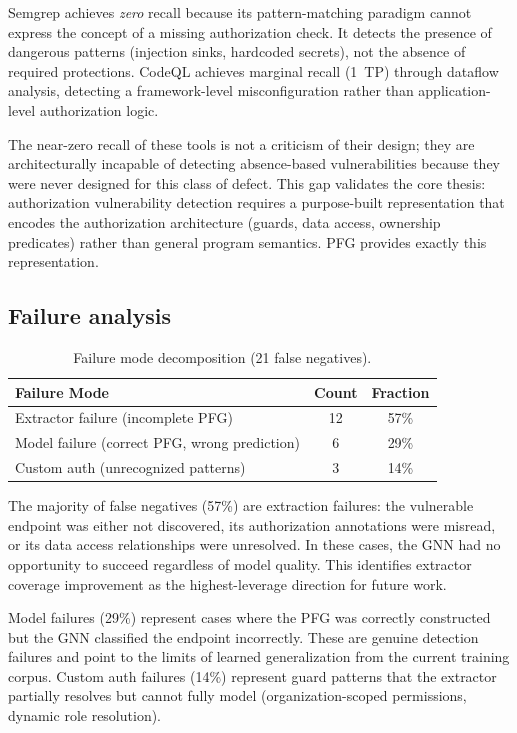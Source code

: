 Semgrep achieves \emph{zero} recall because its pattern-matching paradigm
cannot express the concept of a missing authorization check. It detects the
presence of dangerous patterns (injection sinks, hardcoded secrets), not the
absence of required protections. CodeQL achieves marginal recall (1~TP)
through dataflow analysis, detecting a framework-level misconfiguration
rather than application-level authorization logic.

The near-zero recall of these tools is not a criticism of their design; they
are architecturally incapable of detecting absence-based vulnerabilities
because they were never designed for this class of defect. This gap validates
the core thesis: authorization vulnerability detection requires a
purpose-built representation that encodes the authorization architecture
(guards, data access, ownership predicates) rather than general program
semantics. PFG provides exactly this representation.

\subsection{Failure analysis}
\label{sec:det-failures}

\begin{table}[htbp]
\centering
\caption{Failure mode decomposition (21 false negatives).}
\label{tab:det-failures}
\begin{tabular}{@{}lcc@{}}
\toprule
\textbf{Failure Mode} & \textbf{Count} & \textbf{Fraction} \\
\midrule
Extractor failure (incomplete PFG) & 12 & 57\% \\
Model failure (correct PFG, wrong prediction) & 6 & 29\% \\
Custom auth (unrecognized patterns) & 3 & 14\% \\
\bottomrule
\end{tabular}
\end{table}
The majority of false negatives (57\%) are extraction failures: the
vulnerable endpoint was either not discovered, its authorization annotations
were misread, or its data access relationships were unresolved. In these
cases, the GNN had no opportunity to succeed regardless of model quality.
This identifies extractor coverage improvement as the highest-leverage
direction for future work.

Model failures (29\%) represent cases where the PFG was correctly
constructed but the GNN classified the endpoint incorrectly. These are
genuine detection failures and point to the limits of learned generalization
from the current training corpus. Custom auth failures (14\%) represent
guard patterns that the extractor partially resolves but cannot fully
model (organization-scoped permissions, dynamic role resolution).

